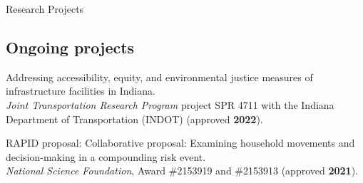 \documentclass{CV} %
\begin{document}
\begin{rSection}{Research Projects}
    \subsection*{Ongoing projects}
    \begin{etaremune}
        \item Addressing accessibility, equity, and environmental justice measures of infrastructure facilities in Indiana.
        \\ \textit{Joint Transportation Research Program} project SPR 4711 with the Indiana Department of Transportation (INDOT) (approved \textbf{2022}).
        \item RAPID proposal: Collaborative proposal: Examining household movements and decision-making in a compounding risk event.
        \\ \textit{National Science Foundation}, Award \#2153919 and \#2153913 (approved \textbf{2021}).
    \end{etaremune}
\end{rSection}
\end{document}
